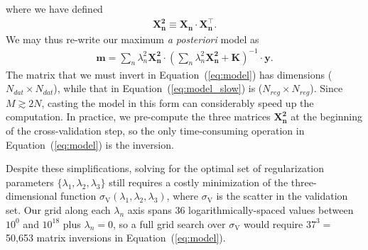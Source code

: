 \documentclass[]{emulateapj}
\begin{document}
%
where we have defined
%
\begin{align}
\label{eq:x2}
\mathbf{X^2_n} \equiv \mathbf{X_n} \cdot \mathbf{X^\top_n}.
\end{align}
%
We may thus re-write our maximum \emph{a posteriori} model as
%
\begin{align}
\label{eq:model}
\mathbf{m} = \sum_n \lambda_n^2 \mathbf{X^2_n}
                  \cdot
                  \left(
                  \sum_n \lambda_n^2 \mathbf{X^2_n} + \mathbf{K}
                  \right)^{-1} 
                  \cdot
                  \mathbf{y}.
\end{align}
%
The matrix that we must invert in Equation~(\ref{eq:model}) has dimensions ($N_{dat} \times N_{dat}$),
while that in Equation~(\ref{eq:model_slow}) is ($N_{reg} \times N_{reg}$). Since
$M \gtrsim 2N$, casting the model in this form can considerably speed up the
computation. In practice, we pre-compute the three matrices $\mathbf{X^2_n}$ at the beginning
of the cross-validation step, so the only time-consuming operation in Equation~(\ref{eq:model})
is the inversion.

Despite these simplifications, solving for the optimal set of regularization parameters $\{ \lambda_1, \lambda_2, \lambda_3 \}$
still requires a costly minimization of the three-dimensional function 
$\sigma_\mathrm{V}(\lambda_1, \lambda_2, \lambda_3)$, where
$\sigma_\mathrm{V}$ is the scatter in the validation set. Our grid along each $\lambda_n$ axis
spans 36 logarithmically-spaced values between $10^{0}$ and $10^{18}$ plus $\lambda_n = 0$, so a full grid search over 
$\sigma_\mathrm{V}$ would require $37^3 =$ 50,653 matrix inversions
in Equation~(\ref{eq:model}).

\end{document}
